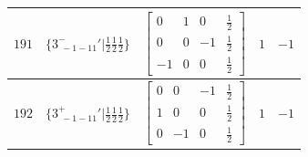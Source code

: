 \documentclass[fleqn,8pt]{jsarticle}
\begin{document}
\begin{longtable}{ccccc}
$ 191 $ & $ \{3^{-}_{\,\,-1-11}{}'|\frac{1}{2} \frac{1}{2} \frac{1}{2}\} $ & $ \begin{bmatrix} 0 & 1 & 0 & \frac{1}{2} \\ 0 & 0 & -1 & \frac{1}{2} \\ -1 & 0 & 0 & \frac{1}{2} \end{bmatrix} $ & $ 1 $ & $ -1 $ \\ \hline
$ 192 $ & $ \{3^{+}_{\,\,-1-11}{}'|\frac{1}{2} \frac{1}{2} \frac{1}{2}\} $ & $ \begin{bmatrix} 0 & 0 & -1 & \frac{1}{2} \\ 1 & 0 & 0 & \frac{1}{2} \\ 0 & -1 & 0 & \frac{1}{2} \end{bmatrix} $ & $ 1 $ & $ -1 $ \\
\end{longtable}
\end{document}
